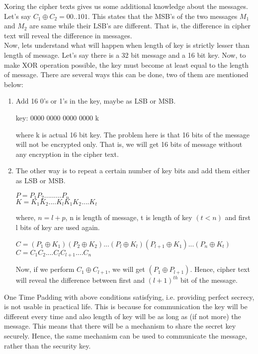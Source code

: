 \documentclass[11pt]{article}
\begin{document}
Xoring the cipher texts gives us some additional knowledge about the messages. Let's say $C_1 \oplus C_2 = 00..101$. This states that the MSB's of the two messages $M_1$ and $M_2$ are same while their LSB's are different. That is, the difference in cipher text will reveal the difference in messages.\\
\newline
Now, lets understand what will happen when length of key is strictly lesser than length of message. Let's say there is a 32 bit message and a 16 bit key. Now, to make XOR operation possible, the key must become at least equal to the length of message. There are several ways this can be done, two of them are mentioned below:
\begin{enumerate}
    \item Add 16 0's or 1's in the key, maybe as LSB or MSB.
    \begin{center}
        key: 0000 0000 0000 0000 k
    \end{center}
    where k is actual 16 bit key. The problem here is that 16 bits of the message will not be encrypted only. That is, we will get 16 bits of message without any encryption in the cipher text.

    \item The other way is to repeat a certain number of key bits and add them either as LSB or MSB.
    \begin{center}
        $P = P_1P_2.........P_n$\\
        $K = K_1K_2....K_lK_1K_2....K_t$
    \end{center}
    where, $n = l + p$, n is length of message, t is length of key $(t < n)$ and first l bits of key are used again.
    \begin{center}
        $C = (P_1 \oplus K_1)(P_2 \oplus K_2)...(P_l \oplus K_l)(P_{l+1} \oplus K_1)...(P_n \oplus K_t)$\\
        $C = C_1C_2....C_lC_{l+1}....C_n$
    \end{center}
    Now, if we perform $C_1 \oplus C_{l+1}$, we will get $(P_1 \oplus P_{l+1})$. Hence, cipher text will reveal the difference between first and $(l+1)^{th}$ bit of the message.
\end{enumerate}
One Time Padding with above conditions satisfying, i.e. providing perfect secrecy, is not usable in practical life. This is because for communication the key will be different every time and also length of key will be as long as (if not more) the message. This means that there will be a mechanism to share the secret key securely. Hence, the same mechanism can be used to communicate the message, rather than the security key.
\end{document}
